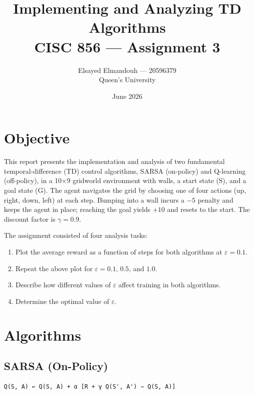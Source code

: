 \documentclass[11pt,a4paper]{article}
\title{Implementing and Analyzing TD Algorithms \\
\large CISC 856 --- Assignment 3}
\author{Elsayed Elmandouh --- 20596379 \\
Queen's University}
\date{June 2026}
\begin{document}
\maketitle
\thispagestyle{empty}

\section{Objective}

This report presents the implementation and analysis of two fundamental temporal-difference (TD) control algorithms, SARSA (on-policy) and Q-learning (off-policy), in a 10$\times$9 gridworld environment with walls, a start state (S), and a goal state (G). The agent navigates the grid by choosing one of four actions (up, right, down, left) at each step. Bumping into a wall incurs a $-5$ penalty and keeps the agent in place; reaching the goal yields $+10$ and resets to the start. The discount factor is $\gamma = 0.9$.

The assignment consisted of four analysis tasks:

\begin{enumerate}
  \item Plot the average reward as a function of steps for both algorithms at $\varepsilon = 0.1$.
  \item Repeat the above plot for $\varepsilon = 0.1$, $0.5$, and $1.0$.
  \item Describe how different values of $\varepsilon$ affect training in both algorithms.
  \item Determine the optimal value of $\varepsilon$.
\end{enumerate}

\section{Algorithms}

\subsection{SARSA (On-Policy)}

\begin{verbatim}
Q(S, A) ← Q(S, A) + α [R + γ Q(S', A') − Q(S, A)]
\end{verbatim}
\end{document}
